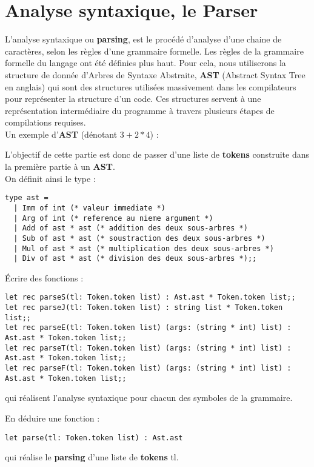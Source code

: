 \documentclass[12pt,letterpaper,onecolumn]{exam}
\begin{document}
\section{Analyse syntaxique, le Parser}
L'analyse syntaxique ou \textbf{parsing}, est le procédé d'analyse d'une chaine de caractères, selon les règles d'une grammaire formelle. Les règles de la grammaire formelle du langage ont été définies plus haut. Pour cela, nous utiliserons la structure de donnée d'Arbres de Syntaxe Abstraite, \textbf{AST} (Abstract Syntax Tree en anglais) qui sont des structures utilisées massivement dans les compilateurs pour représenter la structure d'un code. Ces structures servent à une représentation intermédiaire du programme à travers plusieurs étapes de compilations requises.\\
Un exemple d'\textbf{AST} (dénotant $3+2*4$) :
\begin{center}
\end{center}

L'objectif de cette partie est donc de passer d'une liste de \textbf{tokens} construite dans la première partie à un \textbf{AST}.\\
On définit ainsi le type :
\begin{verbatim}
type ast =
  | Imm of int (* valeur immediate *)
  | Arg of int (* reference au nieme argument *)
  | Add of ast * ast (* addition des deux sous-arbres *)
  | Sub of ast * ast (* soustraction des deux sous-arbres *)
  | Mul of ast * ast (* multiplication des deux sous-arbres *)
  | Div of ast * ast (* division des deux sous-arbres *);;
\end{verbatim}

\begin{questions}
    \question Écrire des fonctions :
    \begin{verbatim}
let rec parseS(tl: Token.token list) : Ast.ast * Token.token list;;
let rec parseJ(tl: Token.token list) : string list * Token.token list;;
let rec parseE(tl: Token.token list) (args: (string * int) list) : Ast.ast * Token.token list;;
let rec parseT(tl: Token.token list) (args: (string * int) list) : Ast.ast * Token.token list;;
let rec parseF(tl: Token.token list) (args: (string * int) list) : Ast.ast * Token.token list;;
    \end{verbatim}
    qui réalisent l'analyse syntaxique pour chacun des symboles de la grammaire.

    \question En déduire une fonction :
    \begin{verbatim}
let parse(tl: Token.token list) : Ast.ast
    \end{verbatim}
    qui réalise le \textbf{parsing} d'une liste de \textbf{tokens} tl.
\end{questions}
\end{document}
